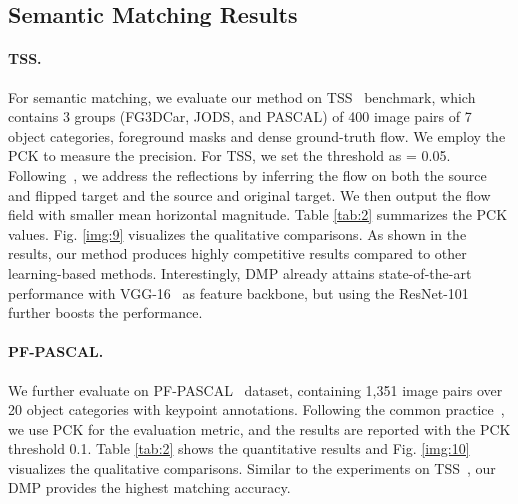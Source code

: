 \documentclass[10pt,twocolumn,letterpaper]{article}
\newcommand{\figref}[1]{Fig. \ref{#1}}
\newcommand{\tabref}[1]{Table \ref{#1}}
\begin{document}
\subsection{Semantic Matching Results}\label{sec:4_4}
\paragraph{TSS.}
For semantic matching, we evaluate our method on TSS~\cite{taniai2016joint} benchmark, which contains 3 groups (FG3DCar, JODS, and PASCAL) of 400 image pairs of 7 object categories, foreground masks and dense ground-truth flow. We employ the PCK to measure the precision. For TSS, we set the threshold as  = 0.05. Following~\cite{truong2020glu}, we address the reflections by inferring the flow on both the source and flipped target and the source and original target. We then output the flow field with smaller mean horizontal magnitude. \tabref{tab:2} summarizes the PCK values. \figref{img:9} visualizes the qualitative comparisons. As shown in the results, our method produces highly competitive results compared to other learning-based methods. Interestingly, DMP already attains state-of-the-art performance with VGG-16~\cite{simonyan2014very} as feature backbone, but using the ResNet-101~\cite{he2016deep} further boosts the performance.
\vspace{-10pt}

\paragraph{PF-PASCAL.}
We further evaluate on PF-PASCAL~\cite{ham2016proposal} dataset, containing 1,351 image pairs over 20 object categories with keypoint annotations. Following the common practice~\cite{rocco2018neighbourhood,han2017scnet}, we use PCK for the evaluation metric, and the results are reported with the PCK threshold  0.1. 
\tabref{tab:2} shows the quantitative results and \figref{img:10} visualizes the qualitative comparisons. Similar to the experiments on TSS~\cite{taniai2016joint}, our DMP provides the highest matching accuracy. 
\end{document}
